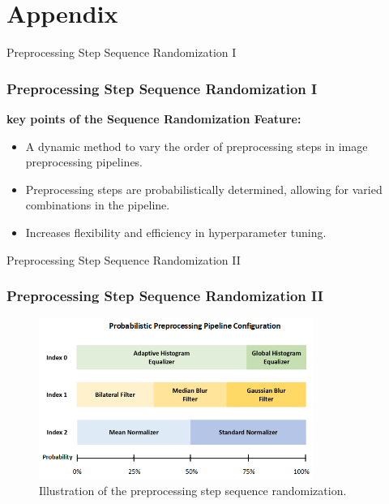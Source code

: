 \section*{Appendix}
\label{appendix_section}


\begin{frame}[fragile]{Preprocessing Step Sequence Randomization I}
    \frametitle{Preprocessing Step Sequence Randomization I}
    \textbf{key points of the Sequence Randomization Feature:}
    \vspace{0.5em}
    \begin{itemize}
        \item A dynamic method to vary the order of preprocessing steps in image preprocessing pipelines.
        \item Preprocessing steps are probabilistically determined, allowing for varied combinations in the pipeline.
        \item Increases flexibility and efficiency in hyperparameter tuning.
    \end{itemize}
\end{frame}

\begin{frame}[fragile]{Preprocessing Step Sequence Randomization II}
    \frametitle{Preprocessing Step Sequence Randomization II}
    \begin{figure}
        \centering
        \includegraphics[width=0.8\textwidth]{figures/pipeline_sequence_randomisation_image.png}
        \caption{Illustration of the preprocessing step sequence randomization.}
    \end{figure}
\end{frame}

